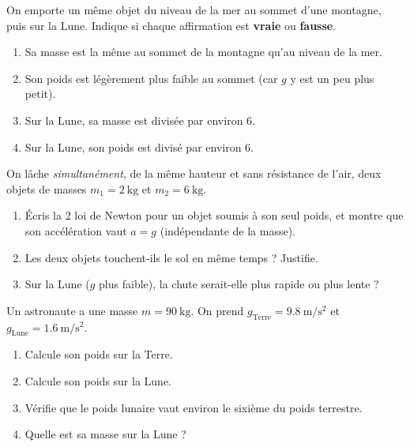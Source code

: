\documentclass[11pt,a4paper]{article}
\begin{document}

\begin{exo}
On emporte un même objet du niveau de la mer au sommet d'une montagne, puis sur la
Lune. Indique si chaque affirmation est \textbf{vraie} ou \textbf{fausse}.
\begin{enumerate}[label=\alph*)]
  \item Sa masse est la même au sommet de la montagne qu'au niveau de la mer.
  \item Son poids est légèrement plus faible au sommet (car $g$ y est un peu plus petit).
  \item Sur la Lune, sa masse est divisée par environ $6$.
  \item Sur la Lune, son poids est divisé par environ $6$.
\end{enumerate}
\end{exo}

\begin{exo}
On lâche \emph{simultanément}, de la même hauteur et sans résistance de l'air, deux
objets de masses $m_1=\qty{2}{\kilogram}$ et $m_2=\qty{6}{\kilogram}$.
\begin{enumerate}[label=\alph*)]
  \item Écris la 2 loi de Newton pour un objet soumis à son seul poids, et
        montre que son accélération vaut $a=g$ (indépendante de la masse).
  \item Les deux objets touchent-ils le sol en même temps ? Justifie.
  \item Sur la Lune ($g$ plus faible), la chute serait-elle plus rapide ou plus lente ?
\end{enumerate}
\end{exo}

\begin{exo}
Un astronaute a une masse $m=\qty{90}{\kilogram}$. On prend
$g_{\text{Terre}}=\qty{9.8}{\metre\per\second\squared}$ et
$g_{\text{Lune}}=\qty{1.6}{\metre\per\second\squared}$.
\begin{enumerate}[label=\alph*)]
  \item Calcule son poids sur la Terre.
  \item Calcule son poids sur la Lune.
  \item Vérifie que le poids lunaire vaut environ le sixième du poids terrestre.
  \item Quelle est sa masse sur la Lune ?
\end{enumerate}
\end{exo}
\end{document}
